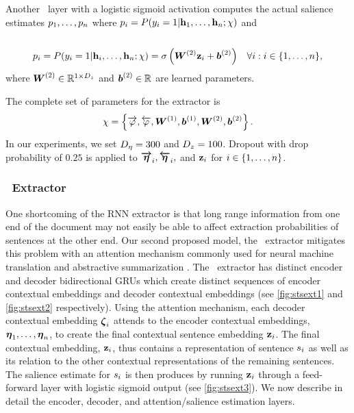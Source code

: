 Another \feedforward~layer with a logistic sigmoid activation computes the
actual salience estimates $p_1,\ldots,p_n$ where $p_i
= P(y_i=1|\mathbf{h}_1,\ldots,\mathbf{h}_n;\chi)$ and \\

\\[-40pt]
\begin{align}
    p_i &= P(y_i=1|\mathbf{h}_i,\ldots,\mathbf{h}_n; \chi) = \sigma\left(\boldsymbol{W}^{(2)}\mathbf{z}_i + \boldsymbol{b}^{(2)}  \right) &
    \forall i :  i \in \{1,\ldots,n\},
\end{align}
where $\boldsymbol{W}^{(2)} \in \mathbb{R}^{1 \times {D_z}}$
and $\boldsymbol{b}^{(2)} \in \mathbb{R}$ are learned parameters.

The complete set of parameters for the extractor is 
\[ \chi = \left\{\overrightarrow{\varphi}, \overleftarrow{\varphi}, \boldsymbol{W}^{(1)}, \boldsymbol{b}^{(1)}, \boldsymbol{W}^{(2)}, \boldsymbol{b}^{(2)} \right\}.\]
In our experiments, we set ${D_\eta}=300$ and ${D_z}=100$.
Dropout with drop probability of $0.25$ is applied to $\boldsymbol{\overrightarrow{\eta}}_i,
\boldsymbol{\overleftarrow{\eta}}_i,$ and $\mathbf{z}_i$ for $i \in \{1,\ldots,n\}$.

\FloatBarrier

\subsubsection{\sts~Extractor} 

One shortcoming of the RNN extractor is that long range information from one
end of the document may not easily be able to affect extraction probabilities
of sentences at the other end.  Our second proposed model, the \sts~extractor
mitigates this problem with an attention mechanism commonly used for neural
machine translation \citep{bahdanau2015,luong2015} and abstractive
summarization \citep{see2017}. The \sts~extractor has distinct encoder and
decoder bidirectional GRUs  which create distinct sequences of encoder
contextual embeddings and decoder contextual embeddings (see
\autoref{fig:stsext1} and \autoref{fig:stsext2} respectively).  Using the
attention mechanism, each decoder contextual embedding $\boldsymbol{\zeta}_i$
attends to the encoder contextual embeddings,
$\boldsymbol{\eta}_1,\ldots,\boldsymbol{\eta}_n$, to create the final contextual
sentence embedding $\mathbf{z}_i$. The final contextual embedding,
$\mathbf{z}_i$, thus contains a representation of sentence $s_i$ as well as
its relation to the other contextual representations of the remaining
sentences.  The salience estimate for $s_i$ is then produces by running
$\mathbf{z}_i$ through a feed-forward layer with logistic sigmoid output (see
\autoref{fig:stsext3}). We now describe in detail the encoder, decoder, and
attention/salience estimation layers.

